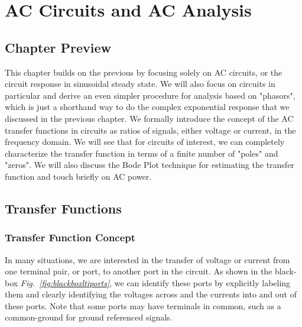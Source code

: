 \chapter{AC Circuits and AC Analysis}
\label{ch:ch02_AC}
\graphicspath{{./figs_AC/}}
\section{Chapter Preview}
This chapter builds on the previous by focusing solely on AC circuits, or the circuit response in sinusoidal steady state.  We will also focus on circuits in particular and derive an even simpler procedure for analysis based on "phasors", which is just a shorthand way to do the complex exponential response that we discussed in the previous chapter.  We formally introduce the concept of the AC transfer functions in circuits as ratios of signals, either voltage or current, in the frequency domain.  We will see that for circuits of interest, we can completely characterize the transfer function in terms of a finite number of "poles" and "zeros".  We will also discuss the Bode Plot technique for estimating the transfer function and touch briefly on AC power.
\newpage
\section{Transfer Functions}
\subsection{Transfer Function Concept}
In many situations, we are interested in the transfer of voltage or current from one terminal pair, or port, to another port in the circuit.  As shown in the black-box \emph{Fig.~\ref{fig:blackboxltiports}}, we can identify these ports by explicitly labeling them and clearly identifying the voltages across and the currents into and out of these ports.  Note that some ports may have terminals in common, such as a common-ground for ground referenced signals.  

